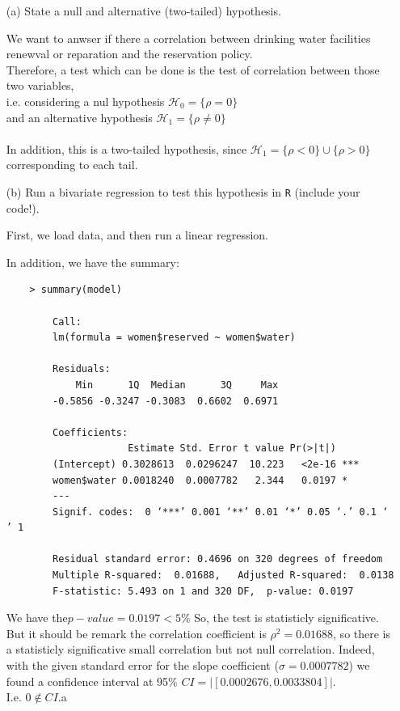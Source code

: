 \documentclass[12pt,letterpaper]{article}
\begin{document}
\newpage
\begin{enumerate}
	\item [(a)] State a null and alternative (two-tailed) hypothesis. 
	
	We want to anwser if there a correlation between drinking water facilities renewval or reparation and the reservation policy.
	\\ Therefore, a test which can be done is the test of correlation between those two variables, \\
	i.e. considering a nul hypothesis $\mathcal{H}_0 = \{ \rho = 0 \}$ \\
	and an alternative hypothesis $\mathcal{H}_1 = \{ \rho \neq 0 \}$\\
	\\
	In addition, this is a two-tailed hypothesis, since  $\mathcal{H}_1 = \{ \rho < 0 \} \cup \{ \rho > 0 \} $ corresponding to each tail.
		
	\item [(b)] Run a bivariate regression to test this hypothesis in \texttt{R} (include your code!).
	
	First, we load data, and then run a linear regression.
	  
	
	In addition, we have the summary:
	\begin{verbatim}
	> summary(model)
		
		Call:
		lm(formula = women$reserved ~ women$water)
		
		Residuals:
		    Min      1Q  Median      3Q     Max 
		-0.5856 -0.3247 -0.3083  0.6602  0.6971 
		
		Coefficients:
		             Estimate Std. Error t value Pr(>|t|)    
		(Intercept) 0.3028613  0.0296247  10.223   <2e-16 ***
		women$water 0.0018240  0.0007782   2.344   0.0197 *  
		---
		Signif. codes:  0 ‘***’ 0.001 ‘**’ 0.01 ‘*’ 0.05 ‘.’ 0.1 ‘ ’ 1
		
		Residual standard error: 0.4696 on 320 degrees of freedom
		Multiple R-squared:  0.01688,	Adjusted R-squared:  0.0138 
		F-statistic: 5.493 on 1 and 320 DF,  p-value: 0.0197
	\end{verbatim}	
	
	We have the$ p-value = 0.0197 < 5\%$ So, the test is statisticly significative.  \\
	But it should be remark the correlation coefficient is $\rho^2=  0.01688$, so there is a statisticly significative small correlation but not null correlation. Indeed, with the given standard error for the slope coefficient ($\sigma = 0.0007782$) we found a confidence interval at 95\% $ CI = |[0.0002676, 0.0033804]| $.\\
	I.e. $0 \notin CI.$a


\end{enumerate}
\end{document}
